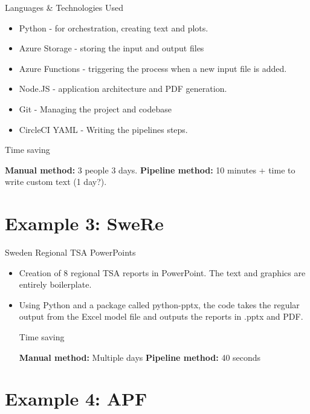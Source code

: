 \documentclass[aspectratio=169]{beamer}
\begin{document}
\begin{frame}{Languages \& Technologies Used}
\begin{itemize}
	\item Python - for orchestration, creating text and plots.
	\item Azure Storage - storing the input and output files
	\item Azure Functions - triggering the process when a new input file is added.
	\item Node.JS - application architecture and PDF generation.
	\item Git - Managing the project and codebase
	\item CircleCI YAML - Writing the pipelines steps.
\end{itemize}	

\begin{block}{Time saving}

\textbf{Manual method:} 3 people 3 days. \newline
\textbf{Pipeline method:} 10 minutes + time to write custom text (1 day?).

\end{block}
\end{frame}

\section{Example 3: SweRe}

\begin{frame}{Sweden Regional TSA PowerPoints}

\begin{itemize}
	\item Creation of 8 regional TSA reports in PowerPoint. The text and graphics are entirely boilerplate. 
	\item Using Python and a package called python-pptx, the code takes the regular output from the Excel model file and outputs the reports in .pptx and PDF.
	\begin{block}{Time saving}

\textbf{Manual method:} Multiple days \newline
\textbf{Pipeline method:} 40 seconds

\end{block}
\end{itemize}
	
\end{frame}

\section{Example 4: APF}
\end{document}
